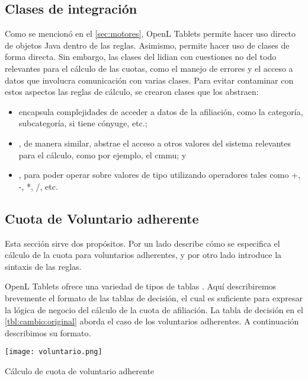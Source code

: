 \subsection{Clases de integración}\label{ssec:integracion:clases}

Como se mencionó en el \cref{sec:motores}, OpenL Tablets permite hacer uso directo de objetos Java dentro de las reglas.
Asimismo, permite hacer uso de clases de forma directa.
Sin embargo, las clases del {\SIDOSPU} lidian con cuestiones no del todo relevantes para el cálculo de las cuotas, como el manejo de errores y el acceso a datos que involucra comunicación con varias clases.
Para evitar contaminar con estos aspectos las reglas de cálculo, se crearon clases que los abstraen:
\begin{itemize}
    \item {} encapsula complejidades de acceder a datos de la afiliación, como la categoría, subcategoría, si tiene cónyuge, etc.;
    \item {}, de manera similar, abstrae el acceso a otros valores del sistema relevantes para el cálculo, como por ejemplo, el \acrshort{cmmu}; y
    \item {}, para poder operar sobre valores de tipo  utilizando operadores tales como +, -, *, /, etc.
\end{itemize}

\subsection{Cuota de Voluntario adherente}

Esta sección sirve dos propósitos.
Por un lado describe cómo se especifica el cálculo de la cuota para voluntarios adherentes, y por otro lado introduce la sintaxis de las reglas.

OpenL Tablets ofrece una variedad de tipos de tablas \cite{openl}.
Aquí describiremos brevemente el formato de las tablas de decisión, el cual es suficiente para expresar la lógica de negocio del cálculo de la cuota de afiliación.
%
La tabla de decisión en el \cref{tbl:cambio:original} aborda el caso de los voluntarios adherentes.
A continuación describimos su formato.

\begin{table*}[h]
    \centering
    \texttt{[image: voluntario.png]}
    \caption{Cálculo de cuota de voluntario adherente}
    \label{tbl:cambio:original}
\end{table*}

